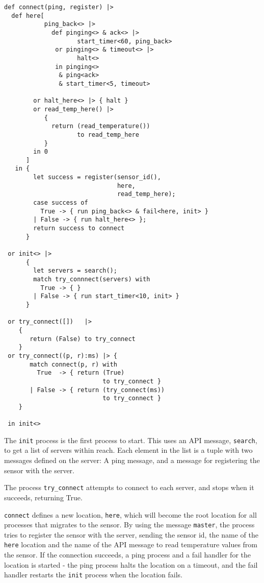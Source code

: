 \begin{verbatim}
def connect(ping, register) |>
  def here[
           ping_back<> |>
             def pinging<> & ack<> |>
                    start_timer<60, ping_back>
              or pinging<> & timeout<> |>
                    halt<>
              in pinging<>
               & ping<ack>
               & start_timer<5, timeout>

        or halt_here<> |> { halt }
        or read_temp_here() |>
           {
             return (read_temperature())
                    to read_temp_here
           }
        in 0
      ]
   in {
        let success = register(sensor_id(),
                               here,
                               read_temp_here);
        case success of
          True -> { run ping_back<> & fail<here, init> }
        | False -> { run halt_here<> };
        return success to connect
      }

 or init<> |>
      {
        let servers = search();
        match try_connnect(servers) with
          True -> { }
        | False -> { run start_timer<10, init> }
      }

 or try_connect([])   |>
    {
       return (False) to try_connect
    }
 or try_connect((p, r):ms) |> {
       match connect(p, r) with
         True  -> { return (True)
                           to try_connect }
       | False -> { return (try_connect(ms))
                           to try_connect }
    }

 in init<>
\end{verbatim}

The \verb!init! process is the first process to start. This uses an
API message, \verb!search!, to get a list of servers within reach.
Each element in the list is a tuple with two messages defined on
the server: A ping message, and a message for registering the
sensor with the server.

The process \verb!try_connect! attempts to connect to each server,
and stops when it succeeds, returning True.

\verb!connect! defines a new location, \verb!here!, which will
become the root location for all processes that migrates to the
sensor. By using the message \verb!master!, the process tries to
register the sensor with the server, sending the sensor id, the
name of the \verb!here! location and the name of the API message to
read temperature values from the sensor. If the connection
succeeds, a ping process and a fail handler for the location is
started - the ping process halts the location on a timeout, and the
fail handler restarts the \verb!init! process when the location
fails.

